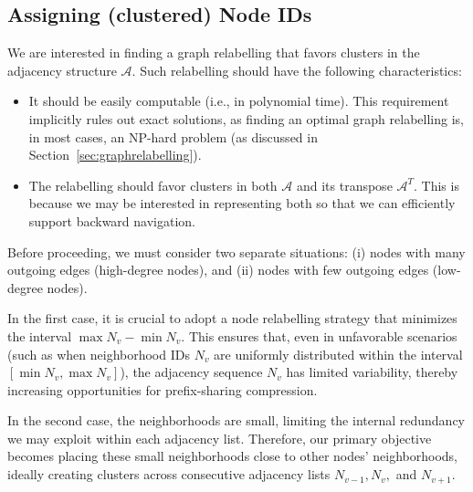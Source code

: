 


\subsection{Assigning (clustered) Node IDs}\label{sec:relabelling}
We are interested in finding a graph relabelling that favors clusters in the adjacency structure $\mathcal{A}$. Such relabelling should have the following characteristics:
\begin{itemize}
    \item It should be easily computable (i.e., in polynomial time). This requirement implicitly rules out exact solutions, as finding an optimal graph relabelling is, in most cases, an NP-hard problem (as discussed in Section~\ref{sec:graphrelabelling}).
    \item The relabelling should favor clusters in both $\mathcal{A}$ and its transpose $\mathcal{A}^{T}$. This is because we may be interested in representing both so that we can efficiently support backward navigation.
\end{itemize}

Before proceeding, we must consider two separate situations: (i) nodes with many outgoing edges (high-degree nodes), and (ii) nodes with few outgoing edges (low-degree nodes).

In the first case, it is crucial to adopt a node relabelling strategy that minimizes the interval $\max N_v - \min N_v$. This ensures that, even in unfavorable scenarios (such as when neighborhood IDs $N_v$ are uniformly distributed within the interval $[\min N_v, \max N_v]$), the adjacency sequence $N_v$ has limited variability, thereby increasing opportunities for prefix-sharing compression.

In the second case, the neighborhoods are small, limiting the internal redundancy we may exploit within each adjacency list. Therefore, our primary objective becomes placing these small neighborhoods close to other nodes' neighborhoods, ideally creating clusters across consecutive adjacency lists $N_{v-1}, N_v,$ and $N_{v+1}$.

